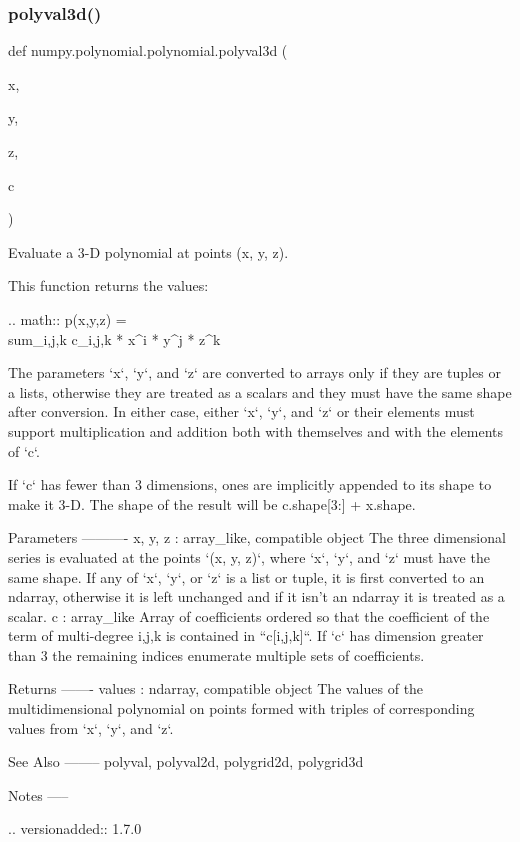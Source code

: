 \subsubsection{\texorpdfstring{polyval3d()}{polyval3d()}}
{\footnotesize\ttfamily def numpy.\+polynomial.\+polynomial.\+polyval3d (\begin{DoxyParamCaption}\item[{}]{x,  }\item[{}]{y,  }\item[{}]{z,  }\item[{}]{c }\end{DoxyParamCaption})}

\begin{DoxyVerb}Evaluate a 3-D polynomial at points (x, y, z).

This function returns the values:

.. math:: p(x,y,z) = \\sum_{i,j,k} c_{i,j,k} * x^i * y^j * z^k

The parameters `x`, `y`, and `z` are converted to arrays only if
they are tuples or a lists, otherwise they are treated as a scalars and
they must have the same shape after conversion. In either case, either
`x`, `y`, and `z` or their elements must support multiplication and
addition both with themselves and with the elements of `c`.

If `c` has fewer than 3 dimensions, ones are implicitly appended to its
shape to make it 3-D. The shape of the result will be c.shape[3:] +
x.shape.

Parameters
----------
x, y, z : array_like, compatible object
    The three dimensional series is evaluated at the points
    `(x, y, z)`, where `x`, `y`, and `z` must have the same shape.  If
    any of `x`, `y`, or `z` is a list or tuple, it is first converted
    to an ndarray, otherwise it is left unchanged and if it isn't an
    ndarray it is  treated as a scalar.
c : array_like
    Array of coefficients ordered so that the coefficient of the term of
    multi-degree i,j,k is contained in ``c[i,j,k]``. If `c` has dimension
    greater than 3 the remaining indices enumerate multiple sets of
    coefficients.

Returns
-------
values : ndarray, compatible object
    The values of the multidimensional polynomial on points formed with
    triples of corresponding values from `x`, `y`, and `z`.

See Also
--------
polyval, polyval2d, polygrid2d, polygrid3d

Notes
-----

.. versionadded:: 1.7.0\end{DoxyVerb}
 \mbox{\label{namespacenumpy_1_1polynomial_1_1polynomial_a0e923b76cbaeab0257e4ce0e0867ee81}} 
